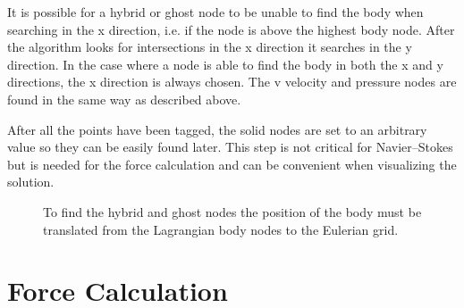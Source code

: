 \documentclass[onehalf,11pt]{beavtex}
\begin{document}
It is possible for a hybrid or ghost node to be unable to find the body when searching in the x direction, i.e. if the node is above the highest body node.
After the algorithm looks for intersections in the x direction it searches in the y direction.
In the case where a node is able to find the body in both the x and y directions, the x direction is always chosen.
The v velocity and pressure nodes are found in the same way as described above.

After all the points have been tagged, the solid nodes are set to an arbitrary value so they can be easily found later.
This step is not critical for Navier--Stokes but is needed for the force calculation and can be convenient when visualizing the solution.
\begin{figure}
	\centering
	
	\caption{To find the hybrid and ghost nodes the position of the body must be translated from the Lagrangian body nodes to the Eulerian grid.}
	\label{fig:node id 1}
\end{figure}


\section{Force Calculation}
\label{Force Calculation}
\end{document}
